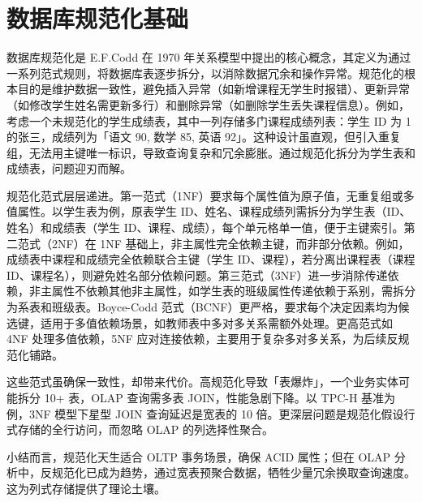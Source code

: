 \chapter{数据库规范化基础}
数据库规范化是 E.F.Codd 在 1970 年关系模型中提出的核心概念，其定义为通过一系列范式规则，将数据库表逐步拆分，以消除数据冗余和操作异常。规范化的根本目的是维护数据一致性，避免插入异常（如新增课程无学生时报错）、更新异常（如修改学生姓名需更新多行）和删除异常（如删除学生丢失课程信息）。例如，考虑一个未规范化的学生成绩表，其中一列存储多门课程成绩列表：学生 ID 为 1 的张三，成绩列为「语文 90, 数学 85, 英语 92」。这种设计虽直观，但引入重复组，无法用主键唯一标识，导致查询复杂和冗余膨胀。通过规范化拆分为学生表和成绩表，问题迎刃而解。\par
规范化范式层层递进。第一范式（1NF）要求每个属性值为原子值，无重复组或多值属性。以学生表为例，原表学生 ID、姓名、课程成绩列需拆分为学生表（ID、姓名）和成绩表（学生 ID、课程、成绩），每个单元格单一值，便于主键索引。第二范式（2NF）在 1NF 基础上，非主属性完全依赖主键，而非部分依赖。例如，成绩表中课程和成绩完全依赖联合主键（学生 ID、课程），若分离出课程表（课程 ID、课程名），则避免姓名部分依赖问题。第三范式（3NF）进一步消除传递依赖，非主属性不依赖其他非主属性，如学生表的班级属性传递依赖于系别，需拆分为系表和班级表。Boyce-Codd 范式（BCNF）更严格，要求每个决定因素均为候选键，适用于多值依赖场景，如教师表中多对多关系需额外处理。更高范式如 4NF 处理多值依赖，5NF 应对连接依赖，主要用于复杂多对多关系，为后续反规范化铺路。\par
这些范式虽确保一致性，却带来代价。高规范化导致「表爆炸」，一个业务实体可能拆分 10+ 表，OLAP 查询需多表 JOIN，性能急剧下降。以 TPC-H 基准为例，3NF 模型下星型 JOIN 查询延迟是宽表的 10 倍。更深层问题是规范化假设行式存储的全行访问，而忽略 OLAP 的列选择性聚合。\par
小结而言，规范化天生适合 OLTP 事务场景，确保 ACID 属性；但在 OLAP 分析中，反规范化已成为趋势，通过宽表预聚合数据，牺牲少量冗余换取查询速度。这为列式存储提供了理论土壤。\par
